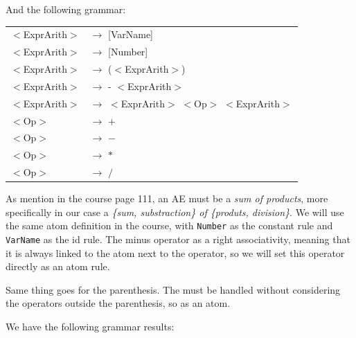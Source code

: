 \documentclass[letterpaper]{article}
\begin{document}
 And the following grammar:
    \begin{center}
            \begin{tabular}{l l}
                $<$ExprArith$>$ &$\rightarrow$ [VarName] \\
                $<$ExprArith$>$ &$\rightarrow$ [Number] \\
                $<$ExprArith$>$ &$\rightarrow$ ($<$ExprArith$>$) \\
                $<$ExprArith$>$ &$\rightarrow$ - $<$ExprArith$>$ \\
                $<$ExprArith$>$ &$\rightarrow$
                $<$ExprArith$>$ $<$Op$>$ $<$ExprArith$>$ \\
                $<$Op$>$ &$\rightarrow$ $+$ \\
                $<$Op$>$ &$\rightarrow$ $-$ \\
                $<$Op$>$ &$\rightarrow$ $*$ \\
                $<$Op$>$ &$\rightarrow$ $/$ \\
            \end{tabular}
    \end{center}


As mention in the course page 111, an AE must be a \textit{sum of products},
more specifically in our case a \textit{\{sum, substraction\}
of \{produts, division\}}. We will use the same atom definition in the course,
with \texttt{Number} as the constant rule and \texttt{VarName} as the id rule.
The minus operator as a right associativity, meaning that it is always linked
to the atom next to the operator, so we will set this operator directly as
an atom rule.

Same thing goes for the parenthesis. The must be handled without considering
the operators outside the parenthesis, so as an atom.

We have the following grammar results:
\end{document}
